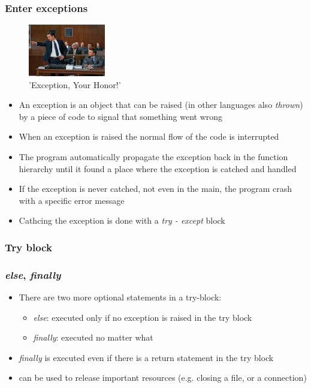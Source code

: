 \documentclass[9pt]{beamer}
\begin{document}
\begin{frame}
  \frametitle{Enter exceptions}
  \begin{figure}
    \includegraphics[width=0.3\textwidth]{avvocato.jpeg}
    \caption{\footnotesize'Exception, Your Honor!'}
  \end{figure}
  \small
  \begin{itemize}
    \item An exception is an object that can be \alert{raised} (in other languages also \textit{thrown}) by
          a piece of code to signal that something went wrong
    \item When an exception is raised the normal flow of the code is interrupted
    \item The program automatically propagate the exception back in the function hierarchy
          until it found a place where the exception is  \alert{catched} and handled
    \item If the exception is never catched, not even in the main, the program crash \alert{with a specific error message}
    \item Cathcing the exception is done with a \emph{try - except} block
  \end{itemize}
\end{frame}


\begin{frame}
  \frametitle{Try block}
  
\end{frame}


\begin{frame}
  \frametitle{\emph{else}, \emph{finally}}
  \begin{itemize}
    \item There are two more optional statements in a try-block:
    \medskip
    \begin{itemize}
      \item \emph{else}: executed only if no exception is raised in the try block
      \medskip
      \item \emph{finally}: executed no matter what
      \medskip
    \end{itemize}
    \item \emph{finally} is executed even if there is a return statement in the try
          block
    \item can be used to release important resources (e.g. closing a
          file, or a connection)
  \end{itemize}
\end{frame}
\end{document}
